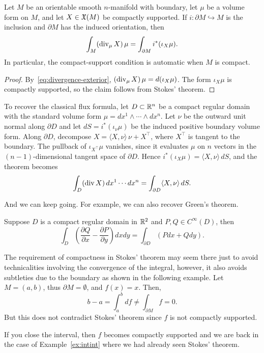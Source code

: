 \begin{corollary}\label{cor:divergence}
	Let $M$ be an orientable smooth $n$-manifold with boundary, let $\mu$ be a volume form on $M$, and let $X\in\mathfrak{X}(M)$ be compactly supported.
	If $i:\partial M\hookrightarrow M$ is the inclusion and $\partial M$ has the induced orientation, then
	\begin{equation}
		\int_M (\operatorname{div}_\mu X)\,\mu = \int_{\partial M}i^*(\iota_X\mu).
	\end{equation}
	In particular, the compact-support condition is automatic when $M$ is compact.
\end{corollary}
\begin{proof}
	By~\eqref{eq:divergence-exterior}, $(\operatorname{div}_\mu X)\,\mu=d(\iota_X\mu)$.
	The form $\iota_X\mu$ is compactly supported, so the claim follows from Stokes' theorem.
\end{proof}

To recover the classical flux formula, let $D\subset\mathbb{R}^n$ be a compact regular domain with the standard volume form $\mu=dx^1\wedge\cdots\wedge dx^n$.
Let $\nu$ be the outward unit normal along $\partial D$ and let $dS=i^*(\iota_\nu\mu)$ be the induced positive boundary volume form.
Along $\partial D$, decompose $X=\langle X,\nu\rangle\,\nu + X^\top$, where $X^\top$ is tangent to the boundary.
The pullback of $\iota_{X^\top}\mu$ vanishes, since it evaluates $\mu$ on $n$ vectors in the $(n-1)$-dimensional tangent space of $\partial D$.
Hence $i^*(\iota_X\mu)=\langle X,\nu\rangle\,dS$, and the theorem becomes
\begin{equation}
	\int_D (\operatorname{div} X)\,dx^1\cdots dx^n = \int_{\partial D}\langle X,\nu\rangle\,dS.
\end{equation}

And we can keep going. For example, we can also recover Green's theorem.

\begin{corollary}
	Suppose $D$ is a compact regular domain in $\mathbb{R}^2$ and $P,Q\in C^\infty(D)$, then
	\begin{equation}
		\int_D \left(\frac{\partial Q}{\partial x} - \frac{\partial P}{\partial y}\right)dxdy = \int_{\partial D}(Pdx + Qdy).
	\end{equation}
\end{corollary}

\begin{remark}
	The requirement of compactness in Stokes' theorem may seem there just to avoid technicalities involving the convergence of the integral, however, it also avoids subtleties due to the boundary as shown in the following example.
	Let $M=(a,b)$, thus $\partial M = \emptyset$, and $f(x)=x$.
	Then,
	\begin{equation}
		b-a = \int_a^b df \neq \int_{\partial M} f = 0.
	\end{equation}
	But this does not contradict Stokes' theorem since $f$ is not compactly supported.

	If you close the interval, then $f$ becomes compactly supported and we are back in the case of Example~\ref{ex:intint} where we had already seen Stokes' theorem.
\end{remark}

